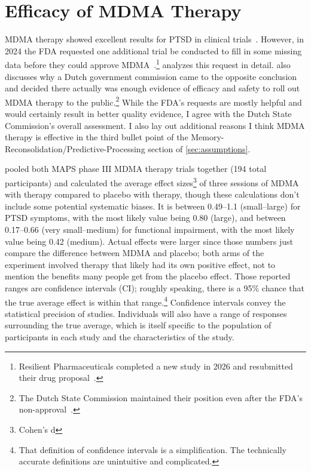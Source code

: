 \documentclass[11pt,oneside]{book}
\let\cite\parencite
\begin{document}
\section{Efficacy of MDMA Therapy}
\label{efficacy}
MDMA therapy showed excellent results for PTSD in clinical trials~\cite{mitchellMDMAClinicalTrial,mitchellMDMAClinicalTrial2}. However, in 2024 the FDA requested one additional trial be conducted to fill in some missing data before they could approve MDMA~\cite{crl}.\footnote{Resilient Pharmaceuticals completed a new study in 2026 and resubmitted their drug proposal~\cite{resilientReapplication}.} \textcite{crlAlpha} analyzes this request in detail. \textcite{fdaVSdutch} also discusses why a Dutch government commission came to the opposite conclusion~\cite{netherlandsMDMA} and decided there actually was enough evidence of efficacy and safety to roll out MDMA therapy to the public.\footnote{The Dutch State Commission maintained their position even after the FDA's non-approval~\cite{dutchParliment}.} While the FDA's requests are mostly helpful and would certainly result in better quality evidence, I agree with the Dutch State Commission's overall assessment. I also lay out additional reasons I think MDMA therapy is effective in the third bullet point of the Memory-Reconsolidation/Predictive-Processing section of \cref{sec:assumptions}.

\textcite{icerReport} pooled both MAPS phase III MDMA therapy trials together (194 total participants) and calculated the average effect sizes\footnote{Cohen's d} of three sessions of MDMA with therapy compared to placebo with therapy, though these calculations don't include some potential systematic biases. It is between 0.49--1.1 (small--large) for PTSD symptoms, with the most likely value being 0.80 (large), and between 0.17--0.66 (very small--medium) for functional impairment, with the most likely value being 0.42 (medium). Actual effects were larger since those numbers just compare the difference between MDMA and placebo; both arms of the experiment involved therapy that likely had its own positive effect, not to mention the benefits many people get from the placebo effect. Those reported ranges are confidence intervals (CI); roughly speaking, there is a 95\% chance that the true average effect is within that range.\footnote{That definition of confidence intervals is a simplification. The technically accurate definitions are unintuitive and complicated.} Confidence intervals convey the statistical precision of studies. Individuals will also have a range of responses surrounding the true average, which is itself specific to the population of participants in each study and the characteristics of the study.
\end{document}
